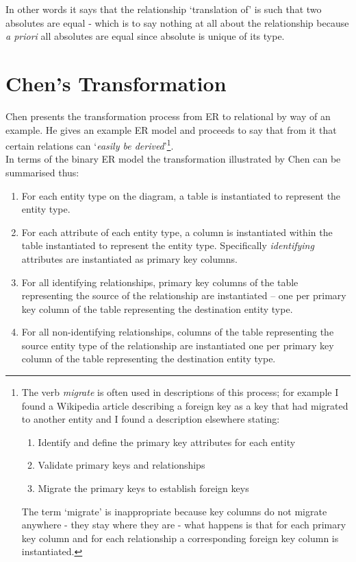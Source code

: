 \documentclass[10pt,a4paper]{article}
\begin{document}
\noindent In other words it says that the relationship `translation of' is such that two absolutes are equal - which is to say nothing at all about the relationship because \emph{a priori} all absolutes are equal since absolute is unique of its type.



\section{Chen's Transformation}
\label{ChensTransformation}

\noindent Chen presents the transformation process from ER to relational by way of an example. 
He gives an example ER model and proceeds to say that from it that certain relations can `\textit{easily be derived}'\footnote{The verb \textit{migrate} is often used in descriptions of this process; for example I found a Wikipedia article describing a foreign key as a key that had migrated to another entity and I found a description elsewhere stating:
\begin{enumerate}
\item {Identify and define the primary key attributes for each entity}
\item {Validate primary keys and relationships}
\item {Migrate the primary keys to establish foreign keys}
\end{enumerate} The term `migrate' is inappropriate because key columns do not migrate anywhere - they stay where they are - what happens is that for each primary key column and for each relationship a corresponding foreign key column is instantiated.
}. \\


\noindent In terms of the binary ER model the transformation illustrated by Chen can be summarised thus:
\begin{enumerate} [I]
	\item For each entity type on the diagram, a table is instantiated to represent the entity type.
  \item For each attribute of each entity type, a column is instantiated within the table
	      instantiated to represent the entity type. Specifically \textit{identifying}
				attributes are instantiated as primary key columns.
  \item For all identifying relationships,
	      primary key columns of the table representing the source of the relationship
				are instantiated --
				one per primary key column of the table representing the destination entity type.
  \item For all non-identifying relationships, columns of the table representing the
	      source entity type of the
	      relationship are instantiated one per primary key column of the 
				table representing the destination entity type.
\end{enumerate}
\end{document}
